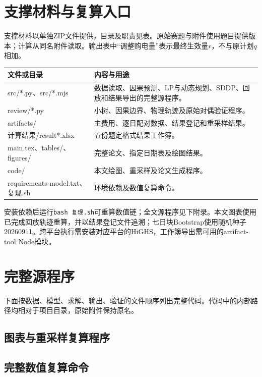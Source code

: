\documentclass[UTF8,a4paper,zihao=-4,fontset=mac]{ctexart}
\begin{document}
\section{支撑材料与复算入口}
支撑材料以单独ZIP文件提供，目录及职责见表。原始赛题与附件使用题目提供版本；计算从同名附件读取。输出表中“调整购电量”表示最终生效量$r$，不与原计划$q$相加。
\begin{longtable}{p{4.4cm}p{9cm}}
\toprule 文件或目录&内容与用途\\\midrule
src/*.py、src/*.mjs & 数据读取、因果预测、LP与动态规划、SDDP、回放和结果导出的完整源程序。\\
review/*.py & 小树、因果边界、物理轨迹及原始对偶验证程序。\\
artifacts/ & 主费用、逐日配对数据、结果登记和重采样结果。\\
计算结果/result*.xlsx & 五份题定格式结果工作簿。\\
main.tex、tables/、figures/ & 完整论文、指定日期表及绘图结果。\\
code/ & 本文绘图、重采样及论文生成程序。\\
requirements-model.txt、复现.sh & 环境依赖及数值复算命令。\\
\bottomrule
\end{longtable}
安装依赖后运行\texttt{bash 复现.sh}可重算数值链；全文源程序见下附录。本文图表使用已完成回放轨迹重算，并以结果登记文件追溯；七日块Bootstrap使用随机种子20260911。跨平台执行需安装对应平台的HiGHS，工作簿导出需可用的artifact-tool Node模块。
\section{完整源程序}
下面按数据、模型、求解、输出、验证的文件顺序列出完整代码。代码中的内部路径均相对于项目目录，原始附件保持原名。

\subsection{图表与重采样复算程序}
\subsection{完整数值复算命令}
\end{document}
